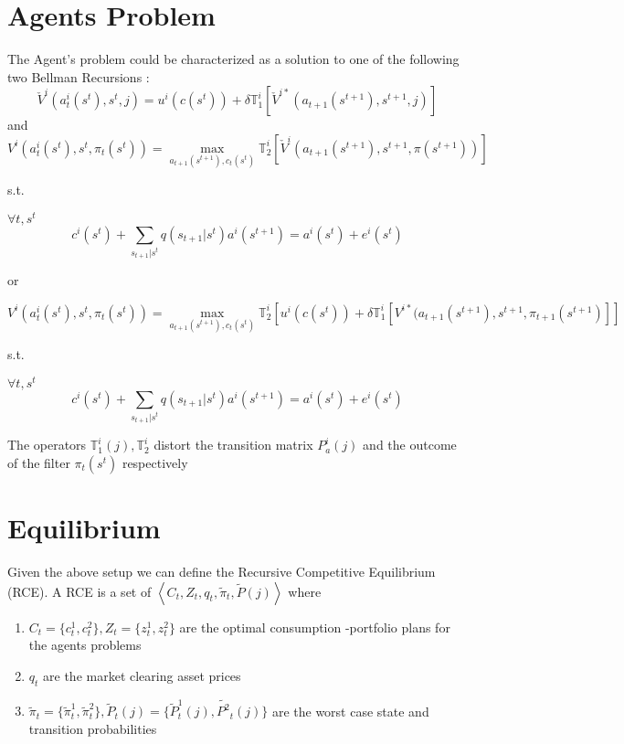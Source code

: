 \documentclass[a4paper,12pt]{article}
\begin{document}
\section{Agents Problem}
\noindent The Agent's problem could be characterized as a solution to one of the following two Bellman Recursions :
\[\check{V}^i(a^i_t(s^t),s^t,j)=u^i(c(s^t))+\delta \mathbb{T}^i_1\left[
\check{V}^{i*}(a_{t+1}(s^{t+1}),s^{t+1},j)\right]\]
and
\[V^i(a^i_t(s^t),s^t,\pi_t(s^t))=\max_{a_{t+1}(s^{t+1}),c_t(s^t)} \mathbb{T}^i_2\left[\check{V}^i(a_{t+1}(s^{t+1}),s^{t+1},\pi(s^{t+1}))\right]\]

s.t.

$\forall t, s^t$
\[c^i(s^t)+\sum_{s_{t+1} | s^t}q(s_{t+1} | s^t)a^i(s^{t+1})=a^i(s^t)+e^i(s^t)\]

or

\[V^i(a^i_t(s^t),s^t,\pi_t(s^t))=\max_{a_{t+1}(s^{t+1}),c_t(s^t)}\mathbb{T}^i_2\left[ u^i(c(s^t))+\delta\mathbb{T}^i_1\left[V^{i*}(a_{t+1}(s^{t+1}),s^{t+1},\pi_{t+1}(s^{t+1})\right]\right]\]

s.t.

$\forall t, s^t$
\[c^i(s^t)+\sum_{s_{t+1} | s^t}q(s_{t+1} | s^t)a^i(s^{t+1})=a^i(s^t)+e^i(s^t)\]

\noindent The operators $\mathbb{T}^i_1(j),\mathbb{T}^i_2$ distort the transition matrix $P_a^i(j)$ and the outcome of the filter $\pi_t(s^t)$ respectively
	
\section{Equilibrium}
\noindent Given the above setup we can define the Recursive Competitive Equilibrium (RCE). 
\noindent A RCE is a set of $\left\langle C_t , Z_t , q_t , \tilde{\pi}_t, \tilde{P}(j) \right\rangle$ where 
\begin{enumerate}
	\item $C_t=\{c^1_t,c^2_t\},Z_t=\{z^1_t,z^2_t\}$ are the optimal consumption -portfolio plans for the agents problems
	\item $q_t$ are the market clearing asset prices
	\item  $\tilde{\pi}_t = \{\tilde{\pi}^1_t, \tilde{\pi}^2_t\}, \tilde{P}_t(j)=\{ \tilde{P}_t^1(j), \tilde{P^2}_t(j)\}$ are the worst case state and transition probabilities
\end{enumerate}
\end{document}
